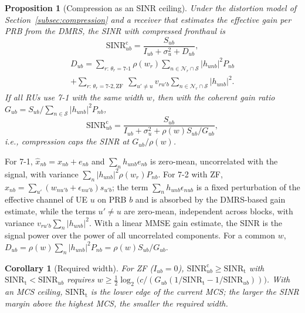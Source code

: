 \documentclass[10pt, final, journal, letterpaper, twocolumn]{IEEEtran}
\newtheorem{proposition}{Proposition}
\newtheorem{corollary}{Corollary}
\begin{document}
\begin{proposition}[Compression as an SINR ceiling]
\label{prop:cap}
Under the distortion model of Section~\ref{subsec:compression} and a receiver that estimates the effective gain per PRB from the DMRS, the SINR with compressed fronthaul is
\begin{equation}
  \mathrm{SINR}^{\mathrm{c}}_{ub} = \frac{S_{ub}}{I_{ub}+\sigma_u^2+D_{ub}},
\end{equation}
\begin{multline}
  D_{ub} = \sum_{r:\,\theta_r=7\text{-}1}\rho(w_r)\sum_{n\in\mathcal{N}_r\cap\mathcal{S}}|h_{unb}|^2 P_{nb} \\
  + \sum_{r:\,\theta_r=7\text{-}2,\mathrm{ZF}}\ \sum_{u'\ne u} v_{r u' b}\sum_{n\in\mathcal{N}_r\cap\mathcal{S}}|h_{unb}|^2 .
\end{multline}
If all RUs use 7-1 with the same width $w$, then with the coherent gain ratio $G_{ub} = S_{ub}/\sum_{n\in\mathcal{S}}|h_{unb}|^2P_{nb}$,
\begin{equation}
  \mathrm{SINR}^{\mathrm{c}}_{ub} = \frac{S_{ub}}{I_{ub}+\sigma_u^2+\rho(w)S_{ub}/G_{ub}},
\end{equation}
i.e., compression caps the SINR at $G_{ub}/\rho(w)$.
\end{proposition}
\begin{IEEEproof}
For 7-1, $\hat x_{nb}=x_{nb}+e_{nb}$ and $\sum_n h_{unb}e_{nb}$ is zero-mean, uncorrelated with the signal, with variance $\sum_n|h_{unb}|^2\rho(w_r)P_{nb}$. For 7-2 with ZF, $\hat x_{nb}=\sum_{u'}(w_{nu'b}+\epsilon_{nu'b})s_{u'b}$; the term $\sum_n h_{unb}\epsilon_{nub}$ is a fixed perturbation of the effective channel of UE $u$ on PRB $b$ and is absorbed by the DMRS-based gain estimate, while the terms $u'\ne u$ are zero-mean, independent across blocks, with variance $v_{ru'b}\sum_{n}|h_{unb}|^2$. With a linear MMSE gain estimate, the SINR is the signal power over the power of all uncorrelated components. For a common $w$, $D_{ub}=\rho(w)\sum_n|h_{unb}|^2P_{nb}=\rho(w)S_{ub}/G_{ub}$.
\end{IEEEproof}

\begin{corollary}[Required width]
\label{cor:width}
For ZF ($I_{ub}=0$), $\mathrm{SINR}^{\mathrm{c}}_{ub}\ge\mathrm{SINR}_{\mathrm{t}}$ with $\mathrm{SINR}_{\mathrm{t}}<\mathrm{SINR}_{ub}$ requires $w\ge\frac12\log_2\!\big(c/(G_{ub}(1/\mathrm{SINR}_{\mathrm{t}}-1/\mathrm{SINR}_{ub}))\big)$. With an MCS ceiling, $\mathrm{SINR}_{\mathrm{t}}$ is the lower edge of the current MCS; the larger the SINR margin above the highest MCS, the smaller the required width.
\end{corollary}
\end{document}
